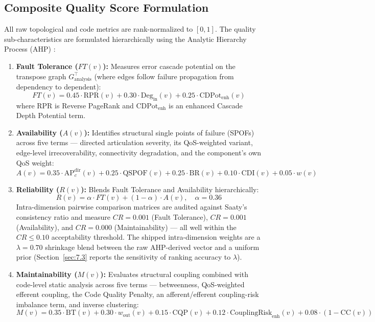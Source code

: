 \subsection{Composite Quality Score Formulation}
\label{sec:4.3}

All raw topological and code metrics are rank-normalized to $[0, 1]$. The quality sub-characteristics are formulated hierarchically using the Analytic Hierarchy Process (AHP) \cite{saaty1980ahp}:

\begin{enumerate}
    \item \textbf{Fault Tolerance ($FT(v)$):} Measures error cascade potential on the transpose graph $G_{\text{analysis}}^\top$ (where edges follow failure propagation from dependency to dependent):
    \begin{equation}
    FT(v) = 0.45 \cdot \text{RPR}(v) + 0.30 \cdot \text{Deg}_{\text{in}}(v) + 0.25 \cdot \text{CDPot}_{\text{enh}}(v)
    \end{equation}
    where RPR is Reverse PageRank and $\text{CDPot}_{\text{enh}}$ is an enhanced Cascade Depth Potential term.
    \item \textbf{Availability ($A(v)$):} Identifies structural single points of failure (SPOFs) across five terms --- directed articulation severity, its QoS-weighted variant, edge-level irrecoverability, connectivity degradation, and the component's own QoS weight:
    \begin{equation}
    A(v) = 0.35 \cdot \text{AP}_c^{\text{dir}}(v) + 0.25 \cdot \text{QSPOF}(v) + 0.25 \cdot \text{BR}(v) + 0.10 \cdot \text{CDI}(v) + 0.05 \cdot w(v)
    \end{equation}
    \item \textbf{Reliability ($R(v)$):} Blends Fault Tolerance and Availability hierarchically:
    \begin{equation}
    R(v) = \alpha \cdot FT(v) + (1 - \alpha) \cdot A(v), \quad \alpha = 0.36
    \end{equation}
    Intra-dimension pairwise comparison matrices are audited against Saaty's consistency ratio and measure $CR = 0.001$ (Fault Tolerance), $CR = 0.001$ (Availability), and $CR = 0.000$ (Maintainability) --- all well within the $CR \le 0.10$ acceptability threshold. The shipped intra-dimension weights are a $\lambda = 0.70$ shrinkage blend between the raw AHP-derived vector and a uniform prior (Section~\ref{sec:7.3} reports the sensitivity of ranking accuracy to $\lambda$).
    \item \textbf{Maintainability ($M(v)$):} Evaluates structural coupling combined with code-level static analysis across five terms --- betweenness, QoS-weighted efferent coupling, the Code Quality Penalty, an afferent/efferent coupling-risk imbalance term, and inverse clustering:
    \begin{equation}
    M(v) = 0.35 \cdot \text{BT}(v) + 0.30 \cdot w_{\text{out}}(v) + 0.15 \cdot \text{CQP}(v) + 0.12 \cdot \text{CouplingRisk}_{\text{enh}}(v) + 0.08 \cdot (1 - \text{CC}(v))
    \end{equation}
\end{enumerate}

